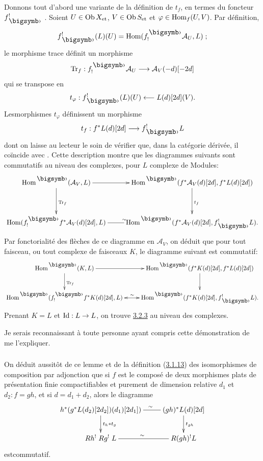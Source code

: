 \documentclass[10pt]{../fichiers-configuration-latex/smfart}
\begin{document}
Donnons tout d'abord une variante de la définition de $t_f$, en termes
du foncteur $f^!_\bigdot$ .
Soient $U\in \operatorname{Ob} X_{\text{\rm et}}$,
$V\in \operatorname{Ob} S_{\text{\rm et}}$ et $\varphi\in \operatorname{Hom}_{f}(U,V)$. Par
définition,
$$
f^{!}_{\bigdot}(L)(U)=\Hom(f^{\bigdot}_{!}\mathcal{A}_{U},L){\quoi}\;;
$$
le morphisme trace définit un morphisme
$$
\Tr_{f}:f^{\bigdot}_{!}\mathcal{A}_{U}\longrightarrow
\mathcal{A}_{V}(-d)[-2d]
$$
qui se transpose en
$$
t_{\varphi}:f^{!}_{\bigdot}(L)(U)\longleftarrow L(d)[2d](V){\quoi}.
$$
Les\pageoriginale morphismes $t_{\varphi}$ définissent un morphisme
$$
t_{f}:f^{\ast}L(d)[2d]\longrightarrow f^{!}_{\bigdot}L
$$
dont on laisse au lecteur le soin de vérifier que, dans la catégorie
dérivée, il coïncide avec . Cette description montre que les
diagrammes suivants sont commutatifs au niveau des complexes, pour $L$
complexe de Modules:
$$
\xymatrix@R=1.25cm{
\Hom^{\bigdot}(\Aa_V,L) \ar[r] \ar[d]^{\Tr_f}& \Hom^{\bigdot}(f^{\ast}\Aa_V(d) [2d], f^{\ast}
L(d) [2d])\ar[d]^{t_f}\\
\Hom(f^{\bigdot}_!f^{\ast}\Aa_V(d)[2d],L) \ar@{-}[r]^{\sim}& \Hom^{\bigdot}(f^{\ast}\Aa_V(d)[2d], f^{!}_{\bigdot}L).
}
$$
Par fonctorialité des flèches de ce diagramme en $\mathcal{A}_{V}$, on
déduit que pour tout faisceau, ou tout complexe de faisceaux $K$, le
diagramme suivant est commutatif:
$$
\xymatrix{
\Hom^{\bigdot}(K,L) \ar[r] \ar[d]^{\Tr_f}& \Hom^{\bigdot}(f^{\ast}K(d)[2d],
f^{\ast}L(d)[2d]) \ar[d]\\
\Hom^{\bigdot}(f^{\bigdot}_!f^{\ast}K(d)[2d],L) \ar@{<->}[r]^{\sim} &\Hom^{\bigdot}(f^{\ast}K(d)[2d], f^{!}_{\bigdot}L).
}
$$
Prenant $K=L$ et $\operatorname{Id}:L\rightarrow L$, on trouve \hyperref[XVIII.lem3.2.3]{3.2.3}
au niveau des complexes.

Je serais reconnaissant à toute personne ayant compris cette
démonstration de me l'expliquer.

\setcounter{subsubsection}{3}
\subsubsection{}
On déduit aussitôt de ce lemme et de la définition
(\hyperref[XVIII.subsubsec3.1.13]{3.1.13}) des 
isomorphismes de composition par adjonction que si $f$ est le composé
de deux morphismes plats de présentation finie compactifiables et
purement de dimension relative $d_{1}$ et $d_{2}:f=gh$, et si
$d=d_{1}+d_{2}$, alors le diagramme
$$
\xymatrix{
h^{\ast}(g^{\ast}L(d_2)[2d_2])(d_1)[2d_1])
\ar@{-}[r]^(.6){\sim}
\ar[d]^{t_h\ast t_g}&(gh)^{\ast}L(d)[2d] \ar[d]^{t_{gh}}\\
Rh^{!} \; Rg^{!} \; L  \ar@{-}[r]^{\sim}&  R(gh)^{!}L
}
$$
est\pageoriginale commutatif.
\end{document}
